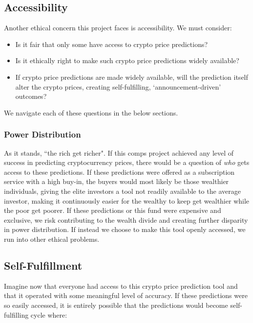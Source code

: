 \documentclass[10pt,twocolumn]{article}
\begin{document}
\subsection{Accessibility}

Another ethical concern this project faces is accessibility. We must consider:

\begin{itemize}
    \item Is it fair that only some have access to crypto price predictions?
    \item Is it ethically right to make such crypto price predictions widely available?
    \item If crypto price predictions are made widely available, will the prediction itself alter the crypto prices, creating self-fulfilling, `announcement-driven' outcomes?
\end{itemize}

We navigate each of these questions in the below sections.

\subsubsection{Power Distribution}

As it stands, ``the rich get richer". If this comps project achieved any level of success in predicting cryptocurrency prices, there would be a question of \textit{who} gets access to these predictions. If these predictions were offered as a subscription service with a high buy-in, the buyers would most likely be those wealthier individuals, giving the elite investors a tool not readily available to the average investor, making it continuously easier for the wealthy to keep get wealthier while the poor get poorer. If these predictions or this fund were expensive and exclusive, we risk contributing to the wealth divide and creating further disparity in power distribution. If instead we choose to make this tool openly accessed, we run into other ethical problems.

\subsection{Self-Fulfillment}

Imagine now that everyone had access to this crypto price prediction tool and that it operated with some meaningful level of accuracy. If these predictions were so easily accessed, it is entirely possible that the predictions would become self-fulfilling cycle where:
\end{document}

